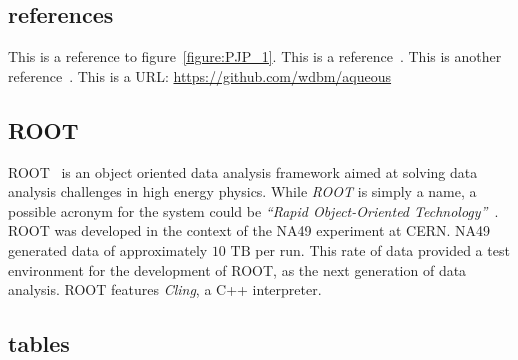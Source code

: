 \subsection{references}

This is a reference to figure~\ref{figure:PJP_1}. This is a reference~\cite{Tianjun_1}. This is another reference~\cite{McCulloch_Pitts_1}. This is a URL: \href{https://github.com/wdbm/aqueous}{\textcolor{black!100}{https://github.com/wdbm/aqueous}}


\subsection{ROOT}

ROOT~\cite{ROOT} is an object oriented data analysis framework aimed at solving data analysis challenges in high energy physics. While \emph{ROOT} is simply a name, a possible acronym for the system could be \emph{``Rapid Object-Oriented Technology''}~\cite{ROOT_acronym}. ROOT was developed in the context of the NA49 experiment at CERN. NA49 generated data of approximately ${10\textrm{ TB}}$ per run. This rate of data provided a test environment for the development of ROOT, as the next generation of data analysis. ROOT features \emph{Cling}, a C++ interpreter.

\newpage

\subsection{tables}

